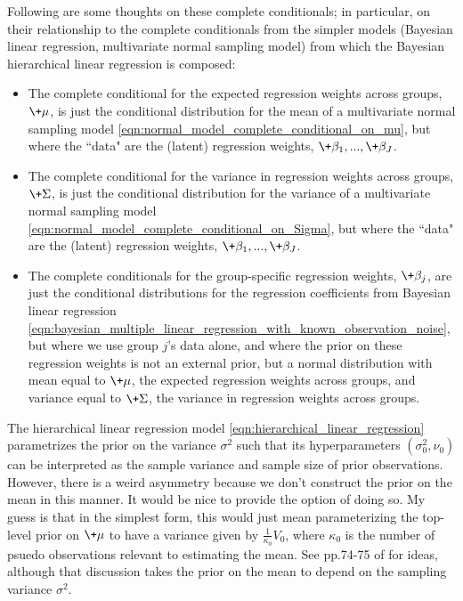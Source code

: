 \documentclass{article} %
\begin{document}
Following are some thoughts on these complete conditionals; in particular,  on their relationship to the complete conditionals from the simpler models (Bayesian linear regression,  multivariate normal sampling model) from which the Bayesian hierarchical linear regression is composed:
\begin{itemize}
\item The complete conditional  for the expected regression weights across groups,  $\+\mu$,   is just the conditional distribution for the mean of a multivariate normal sampling model \eqref{eqn:normal_model_complete_conditional_on_mu},  but where the ``data" are the (latent) regression weights,  $\+\beta_1, ...,\+\beta_J$. 
\item The complete conditional  for the variance in regression weights across groups,  $\+\Sigma$,   is just the conditional distribution for the variance of a multivariate normal sampling model \eqref{eqn:normal_model_complete_conditional_on_Sigma},  but where the ``data" are the (latent) regression weights, $\+\beta_1, ...,\+\beta_J$. 
\item The complete conditionals for the group-specific regression weights,  $\+\beta_j$,  are just the conditional distributions for the regression coefficients from Bayesian linear regression \eqref{eqn:bayesian_multiple_linear_regression_with_known_observation_noise},  but where we use group $j$'s data alone,  and where the prior on these regression weights is not an external prior,  but a normal distribution with mean equal to $\+\mu$,  the expected regression weights across groups,  and variance equal to $\+\Sigma$,  the variance in regression weights across groups. 
\end{itemize}

\begin{question}
The hierarchical linear regression model \eqref{eqn:hierarchical_linear_regression} parametrizes the prior on the variance $\sigma^2$ such that its hyperparameters $(\sigma_0^2,  \nu_0)$ can be interpreted as the sample variance and sample size of prior observations.   However,  there is a weird asymmetry because we don't construct the prior on the mean in this manner.   It would be nice to provide the option of doing so.  	My guess is that in the simplest form,  this would just mean parameterizing the top-level prior on $\+\mu$ to have a variance given by $\frac{1}{\kappa_0} V_0$, where $\kappa_0$ is the number of psuedo observations relevant to estimating the mean.    See pp.74-75 of \cite{hoff2009first} for ideas,  although that discussion takes the prior on the mean to depend on the sampling variance $\sigma^2$.  
\end{question}
\end{document}
